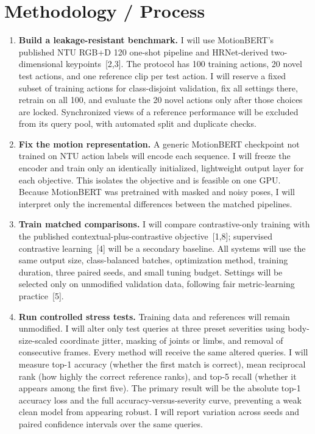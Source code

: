 \documentclass[10pt]{article}
\begin{document}
\newpage
\thispagestyle{proposal}
\section*{Methodology / Process}

\begin{enumerate}
  \item \textbf{Build a leakage-resistant benchmark.} I will use MotionBERT's published NTU RGB+D 120 one-shot pipeline and HRNet-derived two-dimensional keypoints~[2,3]. The protocol has 100 training actions, 20 novel test actions, and one reference clip per test action. I will reserve a fixed subset of training actions for class-disjoint validation, fix all settings there, retrain on all 100, and evaluate the 20 novel actions only after those choices are locked. Synchronized views of a reference performance will be excluded from its query pool, with automated split and duplicate checks.

  \item \textbf{Fix the motion representation.} A generic MotionBERT checkpoint not trained on NTU action labels will encode each sequence. I will freeze the encoder and train only an identically initialized, lightweight output layer for each objective. This isolates the objective and is feasible on one GPU. Because MotionBERT was pretrained with masked and noisy poses, I will interpret only the incremental differences between the matched pipelines.

  \item \textbf{Train matched comparisons.} I will compare contrastive-only training with the published contextual-plus-contrastive objective~[1,8]; supervised contrastive learning~[4] will be a secondary baseline. All systems will use the same output size, class-balanced batches, optimization method, training duration, three paired seeds, and small tuning budget. Settings will be selected only on unmodified validation data, following fair metric-learning practice~[5].

  \item \textbf{Run controlled stress tests.} Training data and references will remain unmodified. I will alter only test queries at three preset severities using body-size-scaled coordinate jitter, masking of joints or limbs, and removal of consecutive frames. Every method will receive the same altered queries. I will measure top-1 accuracy (whether the first match is correct), mean reciprocal rank (how highly the correct reference ranks), and top-5 recall (whether it appears among the first five). The primary result will be the absolute top-1 accuracy loss and the full accuracy-versus-severity curve, preventing a weak clean model from appearing robust. I will report variation across seeds and paired confidence intervals over the same queries.


\end{enumerate}
\end{document}
